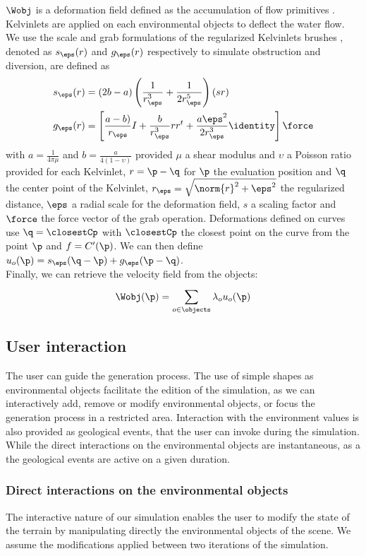 $\Wobj$ is a deformation field defined as the accumulation of flow primitives \cite{Wejchert1991}. Kelvinlets are applied on each environmental objects to deflect the water flow. We use the scale and grab formulations of the regularized Kelvinlets brushes \cite{DeGoes2017}, denoted as $s_\eps(r)$ and $g_\eps(r)$ respectively to simulate obstruction and diversion, are defined as
\begin{align*}
    s_\eps(r) &= (2b - a) \left (\frac{1}{r_\eps^3} + \frac{1}{2r_\eps^5} \right)(s r) \\
    g_\eps(r) &= \left[ \frac{a - b)}{r_\eps}I + \frac{b}{r_\eps^3} r r^t + 
\frac{a \eps^2}{2 r_\eps^3} \identity \right] \force
\end{align*}
with $a = \frac{1}{4 \pi \mu}$ and $b = \frac{a}{4 (1 - \upsilon)}$ provided $\mu$ a shear modulus and $\upsilon$ a Poisson ratio provided for each Kelvinlet, $r = \p - \q$ for $\p$ the evaluation position and $\q$ the center point of the Kelvinlet, $r_\eps = \sqrt{\norm{r}^2 + \eps^2}$ the regularized distance, $\eps$ a radial scale for the deformation field, $s$ a scaling factor and $\force$ the force vector of the grab operation.
Deformations defined on curves use $\q = \closestCp$ with $\closestCp$ the closest point on the curve from the point $\p$ and $f = C'(\p)$. We can then define $u_o(\p) = s_\eps(\q - \p) + g_\eps(\p - \q)$. \\
Finally, we can retrieve the velocity field from the objects:
\begin{align*}
    \Wobj(\p) = \sum_{o \in \objects}^{}{\lambda_o u_o(\p)}
\end{align*}


\subsection{User interaction}
\label{sec:env-obj-interaction}
The user can guide the generation process. The use of simple shapes as environmental objects facilitate the edition of the simulation, as we can interactively add, remove or modify environmental objects, or focus the generation process in a restricted area. Interaction with the environment values is also provided as geological events, that the user can invoke during the simulation. While the direct interactions on the environmental objects are instantaneous, as a the geological events are active on a given duration.

\subsubsection{Direct interactions on the environmental objects}
\label{sec:env-obj-manual-interaction}
The interactive nature of our simulation enables the user to modify the state of the terrain by manipulating directly the environmental objects of the scene. We assume the modifications applied between two iterations of the simulation.

